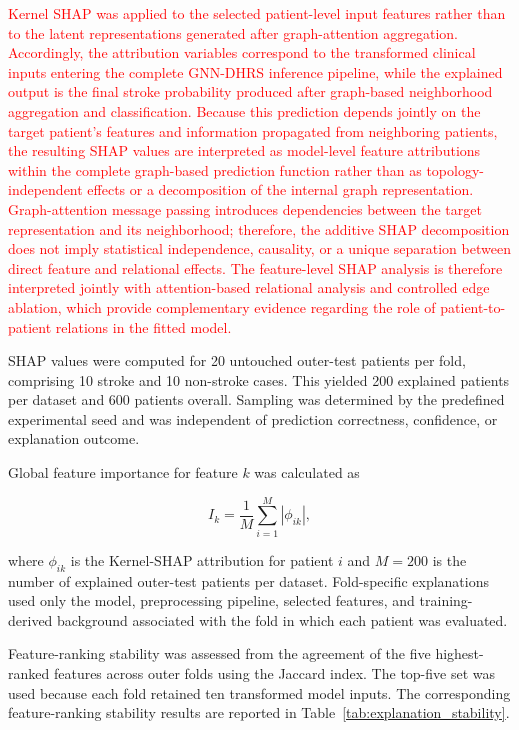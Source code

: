 \documentclass[pdflatex,sn-mathphys-num]{sn-jnl}%
\theoremstyle{thmstyleone}%
\theoremstyle{thmstyletwo}%
\theoremstyle{thmstylethree}%
\begin{document}
\textcolor{red}{
Kernel SHAP was applied to the selected patient-level input features rather
than to the latent representations generated after graph-attention
aggregation. Accordingly, the attribution variables correspond to the
transformed clinical inputs entering the complete GNN-DHRS inference
pipeline, while the explained output is the final stroke probability produced
after graph-based neighborhood aggregation and classification. Because this
prediction depends jointly on the target patient's features and information
propagated from neighboring patients, the resulting SHAP values are
interpreted as model-level feature attributions within the complete
graph-based prediction function rather than as topology-independent effects
or a decomposition of the internal graph representation. Graph-attention
message passing introduces dependencies between the target representation and
its neighborhood; therefore, the additive SHAP decomposition does not imply
statistical independence, causality, or a unique separation between direct
feature and relational effects. The feature-level SHAP analysis is therefore
interpreted jointly with attention-based relational analysis and controlled
edge ablation, which provide complementary evidence regarding the role of
patient-to-patient relations in the fitted model.
}

 {
SHAP values were computed for 20 untouched outer-test patients per fold,
comprising 10 stroke and 10 non-stroke cases. This yielded 200 explained
patients per dataset and 600 patients overall. Sampling was determined by the
predefined experimental seed and was independent of prediction correctness,
confidence, or explanation outcome.
}

Global feature importance for feature \(k\) was calculated as

\begin{equation}
I_k
=
\frac{1}{M}
\sum_{i=1}^{M}
\left|
\phi_{ik}
\right|,
\label{eq:global_shap}
\end{equation}

where \(\phi_{ik}\) is the Kernel-SHAP attribution for patient \(i\) and
\(M=200\) is the number of explained outer-test patients per dataset.
 {
Fold-specific explanations used only the model, preprocessing pipeline,
selected features, and training-derived background associated with the fold
in which each patient was evaluated.
}

 {
Feature-ranking stability was assessed from the agreement of the five
highest-ranked features across outer folds using the Jaccard index. The
top-five set was used because each fold retained ten transformed model inputs.
The corresponding feature-ranking stability results are reported in
 Table~\ref{tab:explanation_stability}.
}
\end{document}
